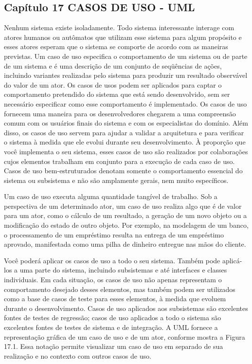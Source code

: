 \documentclass[12pt,a4paper]{article}
\begin{document}
\subsection{Capítulo 17
CASOS DE USO - UML}
Nenhum sistema existe isoladamente. Todo sistema interessante interage
com atores humanos ou autômatos que utilizam esse sistema para algum propósito e esses atores esperam que o sistema se comporte de acordo com as maneiras previstas. Um caso de uso especifica o comportamento de um sistema ou de
parte de um sistema e é uma descrição de um conjunto de seqüências de ações,
incluindo variantes realizadas pelo sistema para produzir um resultado observável do valor de um ator.
Os casos de usos podem ser aplicados para captar o comportamento pretendido do sistema que está sendo desenvolvido, sem ser necessário especificar
como esse comportamento é implementado. Os casos de uso fornecem uma maneira para os desenvolvedores chegarem a uma compreensão comum com os
usuários finais do sistema e com os especialistas do domínio. Além disso, os casos de uso servem para ajudar a validar a arquitetura e para verificar o sistema à
medida que ele evolui durante seu desenvolvimento. À proporção que você implementa o seu sistema, esses casos de uso são realizados por colaborações cujos
elementos trabalham em conjunto para a execução de cada caso de uso.
Casos de uso bem-estruturados denotam somente o comportamento essencial do sistema ou subsistema e não são amplamente gerais, nem muito específicos.

Um caso de uso executa alguma quantidade tangível de trabalho. Sob a
perspectiva de um determinado ator, um caso de uso realiza algo que é de valor
para um ator, como o cálculo de um resultado, a geração de um novo objeto ou
a modificação do estado de outro objeto. Por exemplo, na modelagem de um
banco, o processamento de um empréstimo resulta na entrega de um empréstimo aprovado, manifestada como uma pilha de dinheiro entregue nas mãos do
cliente.

Você poderá aplicar os casos de uso a todo o seu sistema. Também pode
aplicá-los a uma parte do sistema, incluindo subsistemas e até interfaces e classes
individuais. Em cada situação, os casos de uso não apenas representam o comportamento desejado desses elementos, mas também podem ser utilizados como
a base de casos de teste para esses elementos, à medida que evoluem durante o
desenvolvimento. Casos de uso aplicados aos subsistemas são excelentes fontes
de testes de regressão; casos de uso aplicados a todo o sistema são excelentes
fontes de testes de sistema e de integração. A UML fornece a representação gráfica de um caso de uso e de um ator, conforme mostra a Figura 17.1. Essa notação permite visualizar um caso de uso em separado de sua realização e no contexto com outros casos de uso.
\end{document}
